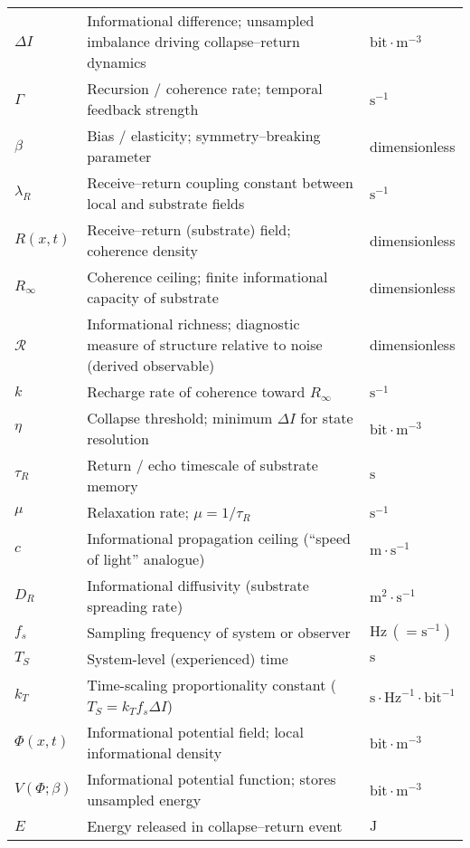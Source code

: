 \begin{longtable}{@{}%
  >{\RaggedRight\arraybackslash}p{}%
  >{\RaggedRight\arraybackslash}p{}%
  >{\RaggedRight\arraybackslash}p{}%
@{}}
$\Delta I$ & Informational difference; unsampled imbalance driving collapse–return dynamics & $\mathrm{bit}\!\cdot\!\mathrm{m}^{-3}$\\[3pt]
$\Gamma$ & Recursion / coherence rate; temporal feedback strength & $\mathrm{s}^{-1}$\\[3pt]
$\beta$ & Bias / elasticity; symmetry–breaking parameter & dimensionless\\[3pt]
$\lambda_{R}$ & Receive–return coupling constant between local and substrate fields & $\mathrm{s}^{-1}$\\[3pt]
$R(x,t)$ & Receive–return (substrate) field; coherence density & dimensionless\\[3pt]
$R_{\infty}$ & Coherence ceiling; finite informational capacity of substrate & dimensionless\\[3pt]
$\mathcal{R}$ & Informational richness; diagnostic measure of structure relative to noise (derived observable) & dimensionless \\[3pt]
$k$ & Recharge rate of coherence toward $R_{\infty}$ & $\mathrm{s}^{-1}$ \\[3pt]
$\eta$ & Collapse threshold; minimum $\Delta I$ for state resolution & $\mathrm{bit}\!\cdot\!\mathrm{m}^{-3}$\\[3pt]
$\tau_{R}$ & Return / echo timescale of substrate memory & $\mathrm{s}$\\[3pt]
$\mu$ & Relaxation rate; $\mu=1/\tau_{R}$ & $\mathrm{s}^{-1}$\\[3pt]
$c$ & Informational propagation ceiling (“speed of light” analogue) & $\mathrm{m}\!\cdot\!\mathrm{s}^{-1}$\\[3pt]
$D_R$ & Informational diffusivity (substrate spreading rate) & $\mathrm{m}^2\!\cdot\!\mathrm{s}^{-1}$\\[3pt]
$f_{s}$ & Sampling frequency of system or observer & $\mathrm{Hz}\,(=\mathrm{s}^{-1})$\\[3pt]
$T_{S}$ & System-level (experienced) time & $\mathrm{s}$\\[3pt]
$k_{T}$ & Time-scaling proportionality constant ($T_{S}=k_{T}f_{s}\Delta I$) & $\mathrm{s}\!\cdot\!\mathrm{Hz}^{-1}\!\cdot\!\mathrm{bit}^{-1}$\\[3pt]
$\Phi(x,t)$ & Informational potential field; local informational density & $\mathrm{bit}\!\cdot\!\mathrm{m}^{-3}$\\[3pt]
$V(\Phi;\beta)$ & Informational potential function; stores unsampled energy & $\mathrm{bit}\!\cdot\!\mathrm{m}^{-3}$\\[3pt]
$E$ & Energy released in collapse–return event & $\mathrm{J}$\\[3pt]

\end{longtable}
